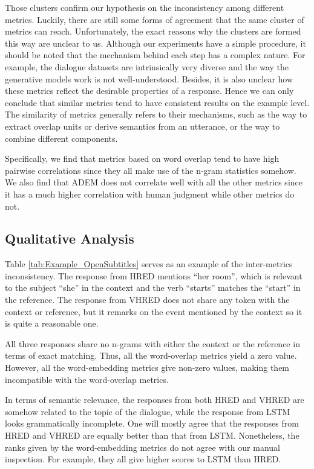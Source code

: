 \documentclass[runningheads]{llncs}
\begin{document}
    Those clusters confirm our hypothesis on the inconsistency among different metrics. Luckily, there are still some forms of agreement that the same cluster of metrics can reach. Unfortunately, the exact reasons why the clusters are formed this way are unclear to us. Although our experiments have a simple procedure, it should be noted that the mechanism behind each step has a complex nature. For example, the dialogue datasets are intrinsically very diverse and the way the generative models work is not well-understood. Besides, it is also unclear how these metrics reflect the desirable properties of a response. Hence we can only conclude that similar metrics tend to have consistent results on the example level. The similarity of metrics generally refers to their mechanisms, such as the way to extract overlap units or derive semantics from an utterance, or the way to combine different components.

    Specifically, we find that metrics based on word overlap tend to have high pairwise correlations since they all make use of the n-gram statistics somehow. We also find that ADEM does not correlate well with all the other metrics since it has a much higher correlation with human judgment while other metrics do not.

    \subsection{Qualitative Analysis}
    
    Table \ref{tab:Example_OpenSubtitles} serves as an example of the inter-metrics inconsistency. The response from HRED mentions ``her room'', which is relevant to the subject ``she'' in the context and the verb ``starts'' matches the ``start'' in the reference. The response from VHRED does not share any token with the context or reference, but it remarks on the event mentioned by the context so it is quite a reasonable one.

    All three responses share no n-grams with either the context or the reference in terms of exact matching. Thus, all the word-overlap metrics yield a zero value. However, all the word-embedding metrics give non-zero values, making them incompatible with the word-overlap metrics.

    In terms of semantic relevance, the responses from both HRED and VHRED are somehow related to the topic of the dialogue, while the response from LSTM looks grammatically incomplete. One will mostly agree that the responses from HRED and VHRED are equally better than that from LSTM. Nonetheless, the ranks given by the word-embedding metrics do not agree with our manual inspection. For example, they all give higher scores to LSTM than HRED.
\end{document}
